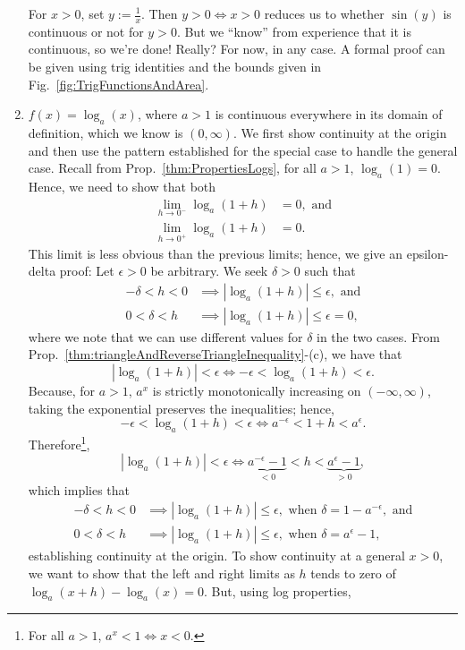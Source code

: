 \begin{enumerate}
    For $x>0$, set $y:= \frac{1}{x}$. Then $y>0 \iff x>0$ reduces us to whether $\sin(y)$ is continuous or not for $y>0$. But we ``know'' from experience that it is continuous, so we're done! Really? For now, in any case. A formal proof can be given using trig identities and the bounds given in Fig.~\ref{fig:TrigFunctionsAndArea}.

    \item \Ans $f(x) = \log_a(x)$, where $a>1$ is continuous everywhere in its domain of definition, which we know is $(0, \infty)$. We first show continuity at the origin and then use the pattern established for the special case to handle the general case. Recall from Prop.~\ref{thm:PropertiesLogs}, for all $a >1$, $\log_a(1) = 0$. Hence, we need to show that both
    \begin{align*}
        \lim_{h \to 0^-} \log_a(1+h) &= 0, \text{ and} \\
         \lim_{h \to 0^+} \log_a(1+h) &= 0.
    \end{align*}
    This limit is less obvious than the previous limits; hence, we give an epsilon-delta proof: Let $\epsilon>0$ be arbitrary. We seek $\delta > 0$ such that
     \begin{align*}
        -\delta < h < 0 &\implies |\log_a(1+h)| \le  \epsilon, \text{ and} \\
        0< \delta < h &\implies  |\log_a(1+h)| \le  \epsilon = 0,
    \end{align*}
    where we note that we can use different values for $\delta$ in the two cases. From Prop.~\ref{thm:triangleAndReverseTriangleInequality}-(c), we have that 
     $$  |\log_a(1+h)| < \epsilon \iff -\epsilon < \log_a(1+h) < \epsilon.$$
     Because, for $a>1$, $a^x$ is strictly monotonically increasing on $(-\infty, \infty)$, taking the exponential preserves the inequalities; hence, 
      $$   -\epsilon < \log_a(1+h) < \epsilon \iff a^{-\epsilon} < 1+h < a^{\epsilon}.$$ 
      Therefore\footnote{For all $a>1$, $a^x < 1 \iff x<0 $.}, 
     $$  |\log_a(1+h)| < \epsilon \iff \underbrace{a^{-\epsilon} -1}_{< 0} < h < \underbrace{a^{\epsilon}-1}_{>0},$$
     which implies that
          \begin{align*}
        -\delta < h < 0 &\implies |\log_a(1+h)| \le  \epsilon, \text{ when } \delta = 1 - a^{-\epsilon}, \text{ and} \\
        0< \delta < h &\implies  |\log_a(1+h)| \le  \epsilon,  \text{ when } \delta = a^{\epsilon}-1,
    \end{align*}
    establishing continuity at the origin. To show continuity at a general $x>0$, we want to show that the left and right limits as $h$ tends to zero of $\log_a(x+h) - \log_a(x) =0$. But, using log properties, 

\end{enumerate}

